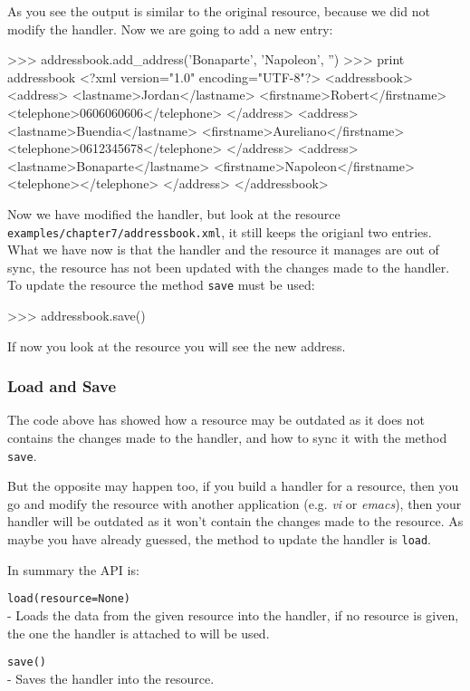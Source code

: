 As you see the output is similar to the original resource, because we did not
modify the handler. Now we are going to add a new entry:

\begin{code}
    >>> addressbook.add_address('Bonaparte', 'Napoleon', '')
    >>> print addressbook
    <?xml version="1.0" encoding="UTF-8"?>
    <addressbook>
      <address>
        <lastname>Jordan</lastname>
        <firstname>Robert</firstname>
        <telephone>0606060606</telephone>
      </address>
      <address>
        <lastname>Buendia</lastname>
        <firstname>Aureliano</firstname>
        <telephone>0612345678</telephone>
     </address>
     <address>
       <lastname>Bonaparte</lastname>
       <firstname>Napoleon</firstname>
       <telephone></telephone>
     </address>
   </addressbook>
\end{code}

Now we have modified the handler, but look at the resource
{\tt examples/chapter7/addressbook.xml}, it still keeps the origianl two
entries. What we have now is that the handler and the resource it manages
are out of sync, the resource has not been updated with the changes made
to the handler. To update the resource the method {\tt save} must be used:

\begin{code}
    >>> addressbook.save()
\end{code}

If now you look at the resource you will see the new address.


\subsubsection{Load and Save}

The code above has showed how a resource may be outdated as it does not
contains the changes made to the handler, and how to sync it with the
method {\tt save}.

But the opposite may happen too, if you build a handler for a resource,
then you go and modify the resource with another application (e.g. {\em vi}
or {\em emacs}), then your handler will be outdated as it won't contain the
changes made to the resource. As maybe you have already guessed, the method
to update the handler is {\tt load}.

In summary the API is:

\begin{api}
  {\tt load(resource=None)}\\
  - Loads the data from the given resource into the handler, if no
    resource is given, the one the handler is attached to will be used.

  {\tt save()}\\
  - Saves the handler into the resource.
\end{api}


\subsubsection{}
